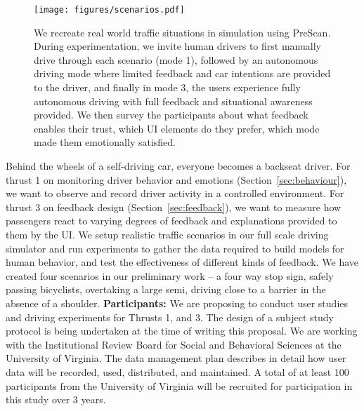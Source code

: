 \begin{figure}
    \centering
    \texttt{[image: figures/scenarios.pdf]}
    \caption{ We recreate real world traffic situations in simulation using PreScan. During experimentation, we invite human drivers to first manually drive through each scenario (mode 1), followed by an autonomous driving mode where limited feedback and car intentions are provided to the driver, and finally in mode 3, the users experience fully autonomous driving with full feedback and situational awareness provided. We then survey the participants about what feedback enables their trust, which UI elements do they prefer, which mode made them emotionally satisfied.  }
    \label{fig:scenario}
\end{figure}

Behind the wheels of a self-driving car, everyone becomes a backseat driver. For thrust 1 on monitoring driver behavior and emotions (Section~\ref{sec:behaviour}), we want to observe and record driver activity in a controlled environment. 
For thrust 3 on feedback design (Section~\ref{sec:feedback}), we want to measure how passengers react to varying degrees of feedback and explanations provided to them by the UI. 
We setup realistic traffic scenarios in our full scale driving simulator and run experiments to gather the data required to build models for human behavior, and test the effectiveness of different kinds of feedback. 
We have created four scenarios in our preliminary work – a four way stop sign, safely passing bicyclists, overtaking a large semi, driving close to a barrier in the absence of a shoulder.
\newline
\noindent \textbf{Participants:}
We are proposing to conduct user studies and driving experiments for Thrusts 1, and 3.
The design of a subject study protocol is being undertaken at the time of writing this proposal. 
We are working with the Institutional Review Board for Social and Behavioral Sciences at the University of Virginia. 
The data management plan describes in detail how user data will be recorded, used, distributed, and maintained. 
A total of at least 100 participants from the University of Virginia will be recruited for participation in this study over 3 years. 
\newline
